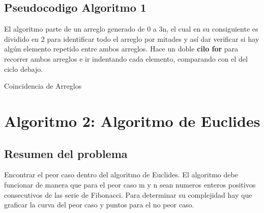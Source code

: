     \subsection{Pseudocodigo Algoritmo 1}
        El algoritmo parte de un arreglo generado de 0 a 3n, el cual en su consiguiente es dividido en 2 para identificar todo el arreglo por mitades y así dar verificar si hay algún elemento repetido entre ambos arreglos. Hace un doble \textbf{cilo for} para recorrer ambos arreglos e ir indentando cada elemento, comparando con el del ciclo debajo.
        \begin{algorithm}
            \caption{Coincidencia de Arreglos
            }\label{alg:two}
           
        \end{algorithm}     

\newpage
\section{Algoritmo 2: Algoritmo de Euclides}
    \subsection{Resumen del problema}
        Encontrar el peor caso dentro del algoritmo de Euclides. El algoritmo debe funcionar de manera que para el peor caso m y n sean numeros enteros positivos consecutivos de las serie de Fibonacci. Para determinar su complejidad hay que graficar la curva del peor caso y puntos para el no peor caso. 
        

